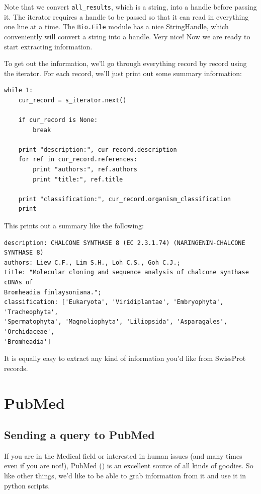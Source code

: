 \documentclass{report}
\begin{document}
Note that we convert \verb|all_results|, which is a string, into a handle before passing it. The iterator requires a handle to be passed so that it can read in everything one line at a time. The \verb|Bio.File| module has a nice StringHandle, which conveniently will convert a string into a handle. Very nice! Now we are ready to start extracting information.


To get out the information, we'll go through everything record by record using the iterator. For each record, we'll just print out some summary information:

\begin{verbatim}
while 1:
    cur_record = s_iterator.next()

    if cur_record is None:
        break

    print "description:", cur_record.description
    for ref in cur_record.references:
        print "authors:", ref.authors
        print "title:", ref.title

    print "classification:", cur_record.organism_classification
    print
\end{verbatim}

This prints out a summary like the following:

\begin{verbatim}
description: CHALCONE SYNTHASE 8 (EC 2.3.1.74) (NARINGENIN-CHALCONE SYNTHASE 8)
authors: Liew C.F., Lim S.H., Loh C.S., Goh C.J.;
title: "Molecular cloning and sequence analysis of chalcone synthase cDNAs of
Bromheadia finlaysoniana.";
classification: ['Eukaryota', 'Viridiplantae', 'Embryophyta', 'Tracheophyta', 
'Spermatophyta', 'Magnoliophyta', 'Liliopsida', 'Asparagales', 'Orchidaceae', 
'Bromheadia']
\end{verbatim}

It is equally easy to extract any kind of information you'd like from SwissProt records.

\section{PubMed}
\label{sec:pub_med}

\subsection{Sending a query to PubMed}

If you are in the Medical field or interested in human issues (and many times even if you are not!), PubMed () is an excellent source of all kinds of goodies. So like other things, we'd like to be able to grab information from it and use it in python scripts.
\end{document}
